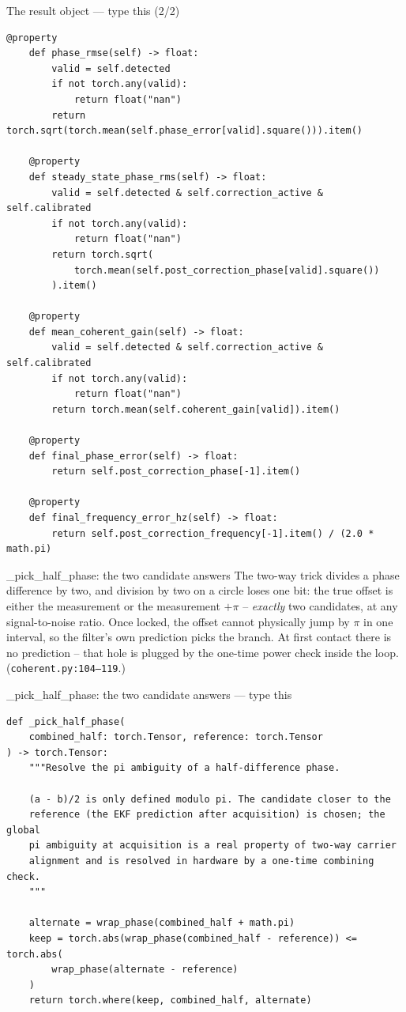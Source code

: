 \documentclass[10pt]{beamer}
\begin{document}
\begin{frame}[fragile]{The result object --- type this (2/2)}
\begin{lstlisting}[basicstyle=\ttfamily\tiny]
    @property
    def phase_rmse(self) -> float:
        valid = self.detected
        if not torch.any(valid):
            return float("nan")
        return torch.sqrt(torch.mean(self.phase_error[valid].square())).item()

    @property
    def steady_state_phase_rms(self) -> float:
        valid = self.detected & self.correction_active & self.calibrated
        if not torch.any(valid):
            return float("nan")
        return torch.sqrt(
            torch.mean(self.post_correction_phase[valid].square())
        ).item()

    @property
    def mean_coherent_gain(self) -> float:
        valid = self.detected & self.correction_active & self.calibrated
        if not torch.any(valid):
            return float("nan")
        return torch.mean(self.coherent_gain[valid]).item()

    @property
    def final_phase_error(self) -> float:
        return self.post_correction_phase[-1].item()

    @property
    def final_frequency_error_hz(self) -> float:
        return self.post_correction_frequency[-1].item() / (2.0 * math.pi)
\end{lstlisting}
\end{frame}

\begin{frame}{\_pick\_half\_phase: the two candidate answers}
  The two-way trick divides a phase difference by two, and
  division by two on a circle loses one bit: the true offset
  is either the measurement or the measurement $+\pi$ --
  \emph{exactly} two candidates, at any signal-to-noise ratio.
  Once locked, the offset cannot physically jump by $\pi$ in
  one interval, so the filter's own prediction picks the
  branch. At first contact there is no prediction -- that hole
  is plugged by the one-time power check inside the loop.
  (\texttt{coherent.py:104--119}.)
\end{frame}

\begin{frame}[fragile]{\_pick\_half\_phase: the two candidate answers --- type this}
\begin{lstlisting}[basicstyle=\ttfamily\tiny]
def _pick_half_phase(
    combined_half: torch.Tensor, reference: torch.Tensor
) -> torch.Tensor:
    """Resolve the pi ambiguity of a half-difference phase.

    (a - b)/2 is only defined modulo pi. The candidate closer to the
    reference (the EKF prediction after acquisition) is chosen; the global
    pi ambiguity at acquisition is a real property of two-way carrier
    alignment and is resolved in hardware by a one-time combining check.
    """

    alternate = wrap_phase(combined_half + math.pi)
    keep = torch.abs(wrap_phase(combined_half - reference)) <= torch.abs(
        wrap_phase(alternate - reference)
    )
    return torch.where(keep, combined_half, alternate)
\end{lstlisting}
\end{frame}
\end{document}
